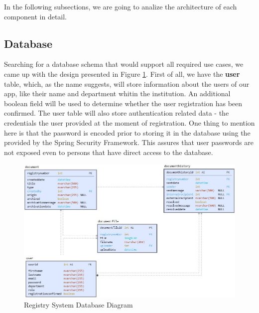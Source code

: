 In the following subsections, we are going to analize the architecture of each component in detail.



\subsection{Database}
\label{subsection:dbLayer}

Searching for a database schema that would support all required use cases, we came up with the design presented in Figure \ref{db}. First of all, we have the \textbf{user} table, which, as the name suggests, will store information about the users of our app, like their name and department whitin the institution. An additional boolean field will be used to determine whether the user registration has been confirmed. The user table will also store authentication related data - the credentials the user provided at the moment of registration. One thing to mention here is that the password is encoded prior to storing it in the database using the  provided by the Spring Security Framework. This assures that user passwords are not exposed even to persons that have direct access to the database.

\begin{figure}[H]
    \centering
    \includegraphics[width=6in]{images/db}
    \caption{Registry System Database Diagram}
    \label{db}
\end{figure}

